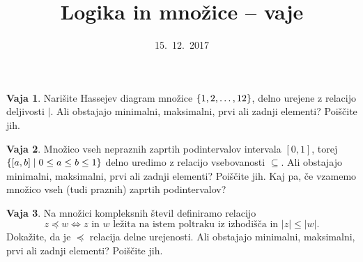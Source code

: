 \documentclass{article}
\theoremstyle{definition}
\newtheorem{vaja}{Vaja}
\begin{document}
\title{Logika in množice -- vaje}
\date{15.~12.~2017}
\maketitle

%
%
%
%
%
%
%
%

\begin{vaja}
  Narišite Hassejev diagram množice $\set{1, 2, \ldots, 12}$, delno urejene z relacijo deljivosti $|$. Ali obstajajo minimalni, maksimalni, prvi ali zadnji elementi? Poiščite jih.
\end{vaja}

\begin{vaja}
  Množico vseh nepraznih zaprtih podintervalov intervala $[0, 1]$, torej $\set{[a, b]}{0 \leq a \leq b \leq 1}$ delno uredimo z relacijo vsebovanosti $\subseteq$. Ali obstajajo minimalni, maksimalni, prvi ali zadnji elementi? Poiščite jih. Kaj pa, če vzamemo množico vseh (tudi praznih) zaprtih podintervalov?
\end{vaja}

\begin{vaja}
  Na množici kompleksnih števil definiramo relacijo
  \begin{equation*}
    z \preccurlyeq w \iff \text{$z$ in $w$ ležita na istem poltraku iz izhodišča in $|z| \leq |w|$}.
  \end{equation*}
  Dokažite, da je $\preccurlyeq$ relacija delne urejenosti. Ali obstajajo minimalni, maksimalni, prvi ali zadnji elementi? Poiščite jih.
\end{vaja}
\end{document}
